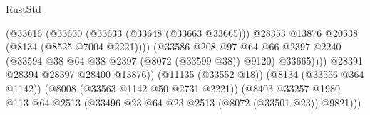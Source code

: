 \begin{lexlean}{RustStd}
\begin{coremodule}
                                                      (@33616
                                                        (@33630
                                                          (@33633 (@33648 (@33663 @33665)))
                                                          @28353
                                                          @13876
                                                          @20538
                                                          (@8134 (@8525 @7004 @2221))))
                                                      (@33586
                                                        @208
                                                        @97
                                                        @64
                                                        @66
                                                        @2397
                                                        @2240
                                                        (@33594
                                                          @38
                                                          @64
                                                          @38
                                                          @2397
                                                          (@8072 (@33599 @38))
                                                          @9120)
                                                        @33665))))
                                                @28391
                                                @28394
                                                @28397
                                                @28400
                                                @13876))
                                            (@11135 (@33552 @18))
                                            (@8134 (@33556 @364 @1142))
                                            (@8008 (@33563 @1142 @50 @2731 @2221))
                                            (@8403
                                              @33257
                                              @1980
                                              @113
                                              @64
                                              @2513
                                              (@33496
                                                @23
                                                @64
                                                @23
                                                @2513
                                                (@8072 (@33501 @23))
                                                @9821)))

\end{coremodule}
\end{lexlean}
